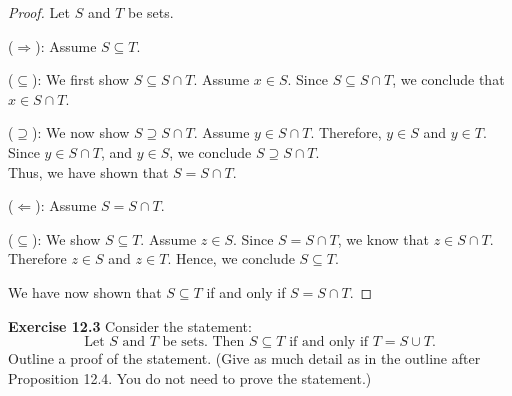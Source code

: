 \documentclass[12pt,oneside]{article}
\newenvironment{exercise}[1]{\vspace{.1in}\noindent\textbf{Exercise #1 \hspace{.05em}}}{}
\begin{document}
\begin{proof}
Let $S$ and $T$ be sets. 

($\Rightarrow$): Assume $S \subseteq T$.

\hspace{\parindent} ($\subseteq$): We first show $S \subseteq S \cap T$. Assume $x \in S$. Since $S \subseteq S \cap T$, we conclude that $x \in S \cap T$.

\hspace{\parindent} ($\supseteq$): We now show $S \supseteq S \cap T$. Assume $y \in S \cap T$. Therefore, $y \in S$ and $y \in T$. Since $y \in S \cap T$, and $y \in S$, we conclude $S \supseteq S \cap T$. \\
Thus, we have shown that $S = S \cap T$.

($\Leftarrow$): Assume $S = S \cap T$.

\hspace{\parindent} ($\subseteq$): We show $S \subseteq T$. Assume $z \in S$. Since $S = S \cap T$, we know that $z \in S \cap T$. Therefore $z \in S$ and $z \in T$. Hence, we conclude $S \subseteq T$.

We have now shown that $S \subseteq T$ if and only if $S = S \cap T$.
\end{proof}



\begin{exercise}{12.3}
Consider the statement:
\[\text{Let $S$ and $T$ be sets. Then $S \subseteq T$ if and only if $T = S \cup T$.}\]
Outline a proof of the statement. (Give as much detail as in the outline after Proposition 12.4. You do not need to prove the statement.)
\end{exercise}
\end{document}

